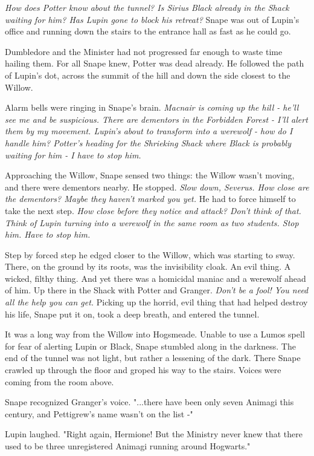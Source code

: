 \documentclass[a4paper,11pt]{article}
\begin{document}
\emph{How does Potter know about the tunnel? Is Sirius Black already in the Shack waiting for him? Has Lupin gone to block his retreat?} Snape was out of Lupin's office and running down the stairs to the entrance hall as fast as he could go.

Dumbledore and the Minister had not progressed far enough to waste time hailing them. For all Snape knew, Potter was dead already. He followed the path of Lupin's dot, across the summit of the hill and down the side closest to the Willow.

Alarm bells were ringing in Snape's brain. \emph{Macnair is coming up the hill - he'll see me and be suspicious. There are dementors in the Forbidden Forest - I'll alert them by my movement. Lupin's about to transform into a werewolf - how do I handle him? Potter's heading for the Shrieking Shack where Black is probably waiting for him - I have to stop him.}

Approaching the Willow, Snape sensed two things: the Willow wasn't moving, and there were dementors nearby. He stopped. \emph{Slow down, Severus. How close are the dementors? Maybe they haven't marked you yet.} He had to force himself to take the next step. \emph{How close before they notice and attack? Don't think of that. Think of Lupin turning into a werewolf in the same room as two students. Stop him. Have to stop him.}

Step by forced step he edged closer to the Willow, which was starting to sway. There, on the ground by its roots, was the invisibility cloak. An evil thing. A wicked, filthy thing. And yet there was a homicidal maniac and a werewolf ahead of him. Up there in the Shack with Potter and Granger. \emph{Don't be a fool! You need all the help you can get.} Picking up the horrid, evil thing that had helped destroy his life, Snape put it on, took a deep breath, and entered the tunnel.

It was a long way from the Willow into Hogsmeade. Unable to use a Lumos spell for fear of alerting Lupin or Black, Snape stumbled along in the darkness. The end of the tunnel was not light, but rather a lessening of the dark. There Snape crawled up through the floor and groped his way to the stairs. Voices were coming from the room above.

Snape recognized Granger's voice. "...there have been only seven Animagi this century, and Pettigrew's name wasn't on the list -"

Lupin laughed. "Right again, Hermione! But the Ministry never knew that there used to be three unregistered Animagi running around Hogwarts."
\end{document}
